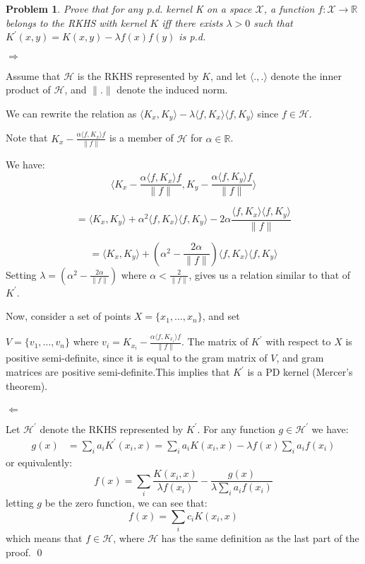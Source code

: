 \documentclass[12pt]{article}
\newtheorem{ex}{Problem}
\begin{document}
	\begin{bx}
	
	\begin{ex}
			Prove that for any p.d. kernel K on a space $\mathcal{X} $, a function $f: \mathcal{X} \rightarrow \mathbb{R}$ belongs to the RKHS with kernel $K$ iff there exists $\lambda>0$ such that $K^\prime(x,y)=K(x,y)-\lambda f(x)f(y)$ is p.d.
	\end{ex}
	\tcblower
	$\Rightarrow$
	
	Assume that $\mathcal{H}$ is the RKHS represented by $K$, and let $\langle .,.\rangle$ denote the inner product of $\mathcal{H}$, and $\|.\|$ denote the induced norm.
	
	
	We can rewrite the relation as $\langle K_x,K_y \rangle -\lambda \langle f,K_x\rangle \langle f,K_y\rangle$ since $f\in \mathcal{H}$.
	
	Note that $ K_x-\frac{\alpha\langle f,K_x\rangle f}{\|f\|}$ is a member of $\mathcal{H}$ for $\alpha \in \mathbb{R}$.
	
	We have:
	$$
		\langle K_x-\frac{\alpha\langle f,K_x\rangle f}{\|f\|}, K_y-\frac{\alpha\langle f,K_y\rangle f}{\|f\|}\rangle 
	$$
	
	$$
	= \langle K_x,K_y\rangle + \alpha^{2}\langle f,K_x\rangle\langle f,K_y\rangle - 2\alpha 
	\frac{\langle f,K_x\rangle \langle f,K_y\rangle}{\|f\|}
	$$
	
	$$
	= \langle K_x,K_y\rangle + (\alpha^2-\frac{2\alpha}{\|f\|})\langle f,K_x\rangle \langle f,K_y\rangle
	$$
	Setting $\lambda = (\alpha^2-\frac{2\alpha}{\|f\|})$ where $\alpha<\frac{2}{\|f\|}$, gives us a relation similar to that of $K^\prime$.
	
	Now, consider a set of points $X=\{x_1,\dots,x_n\}$, and set
	
	 $V=\{v_1,\dots,v_n\}$ where $v_i= K_{x_i}-\frac{\alpha\langle f,K_{x_i}\rangle f}{\|f\|}$. The matrix of $K^\prime$ with respect to $X$ is positive semi-definite, since it is equal to the gram matrix of $V$, and gram matrices are positive semi-definite.This implies that $K^\prime$ is a PD kernel (Mercer's theorem).\\ \\
	 $\Leftarrow$
	 
	 Let $\mathcal{H^\prime}$ denote the RKHS represented by $K^\prime$. For any function $g\in\mathcal{H}^\prime$ we have:
	 \begin{align*}
	 g(x)&=\sum\limits_{i}a_iK^\prime(x_i,x) =\sum\limits_{i}a_iK(x_i,x) - \lambda f(x)\sum\limits_{i}a_if(x_i)
	 \end{align*}
 or equivalently:
 \[
 f(x) = \sum\limits_{i}\frac{K(x_i,x)}{\lambda f(x_i)}-\frac{g(x)}{\lambda\sum\limits_{i}a_if(x_i)}
 \]
 letting $g$ be the zero function, we can see that:
 \[
 f(x)=\sum\limits_{i}c_iK(x_i,x)
 \]
 which means that $f\in\mathcal{H}$, where $\mathcal{H}$ has the same definition as the last part of the proof.
 \qed
\end{bx}
	
	
\end{document}
